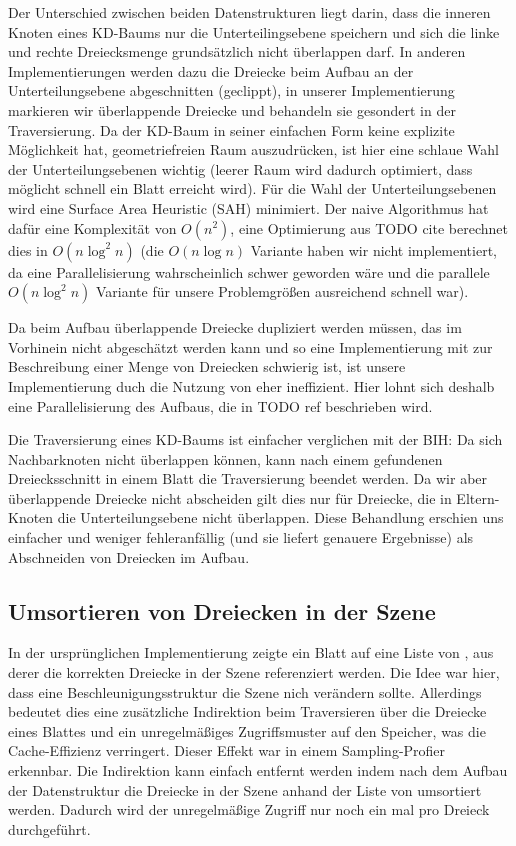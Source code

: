 Der Unterschied zwischen beiden Datenstrukturen liegt darin, dass die inneren Knoten eines KD-Baums nur die Unterteilingsebene speichern und sich die linke und rechte Dreiecksmenge grundsätzlich nicht überlappen darf. In anderen Implementierungen werden dazu die Dreiecke beim Aufbau an der Unterteilungsebene abgeschnitten (geclippt), in unserer Implementierung markieren wir überlappende Dreiecke und behandeln sie gesondert in der Traversierung. Da der KD-Baum in seiner einfachen Form keine explizite Möglichkeit hat, geometriefreien Raum auszudrücken, ist hier eine schlaue Wahl der Unterteilungsebenen wichtig (leerer Raum wird dadurch optimiert, dass möglicht schnell ein Blatt erreicht wird). Für die Wahl der Unterteilungsebenen wird eine Surface Area Heuristic (SAH) minimiert. Der naive Algorithmus hat dafür eine Komplexität von $O(n^2)$, eine Optimierung aus TODO cite berechnet dies in $O(n \log^2 n)$ (die $O(n \log n)$ Variante haben wir nicht implementiert, da eine Parallelisierung wahrscheinlich schwer geworden wäre und die parallele $O(n \log^2 n)$ Variante für unsere Problemgrößen ausreichend schnell war).

Da beim Aufbau überlappende Dreiecke dupliziert werden müssen, das im Vorhinein nicht abgeschätzt werden kann und so eine Implementierung mit  zur Beschreibung einer Menge von Dreiecken schwierig ist, ist unsere Implementierung duch die Nutzung von  eher ineffizient. Hier lohnt sich deshalb eine Parallelisierung des Aufbaus, die in TODO ref beschrieben wird.

Die Traversierung eines KD-Baums ist einfacher verglichen mit der BIH: Da sich Nachbarknoten nicht überlappen können, kann nach einem gefundenen Dreiecksschnitt in einem Blatt die Traversierung beendet werden. Da wir aber überlappende Dreiecke nicht abscheiden gilt dies nur für Dreiecke, die in Eltern-Knoten die Unterteilungsebene nicht überlappen. Diese Behandlung erschien uns einfacher und weniger fehleranfällig (und sie liefert genauere Ergebnisse) als Abschneiden von Dreiecken im Aufbau.

\subsection{Umsortieren von Dreiecken in der Szene}

In der ursprünglichen Implementierung zeigte ein Blatt auf eine Liste von , aus derer die korrekten Dreiecke in der Szene referenziert werden. Die Idee war hier, dass eine Beschleunigungsstruktur die Szene nich verändern sollte. Allerdings bedeutet dies eine zusätzliche Indirektion beim Traversieren über die Dreiecke eines Blattes und ein unregelmäßiges Zugriffsmuster auf den Speicher, was die Cache-Effizienz verringert. Dieser Effekt war in einem Sampling-Profier erkennbar. Die Indirektion kann einfach entfernt werden indem nach dem Aufbau der Datenstruktur die Dreiecke in der Szene anhand der Liste von  umsortiert werden. Dadurch wird der unregelmäßige Zugriff nur noch ein mal pro Dreieck durchgeführt.

